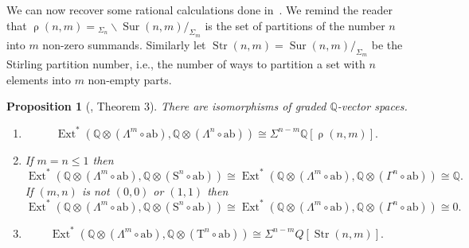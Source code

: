 \documentclass[psamsfonts]{amsart}
\theoremstyle{plain}
\newtheorem{prop}[thm]{Proposition}
\theoremstyle{definition}
\theoremstyle{remark}
\newcommand{\Q}{\mathbb{Q}}
\newcommand{\abelianization}{\mathrm{ab}}
\newcommand{\tensor}{\mathrm{T}}
\newcommand{\symm}{\mathrm{S}}
\DeclareMathOperator{\ext}{Ext}
\DeclareMathOperator{\sur}{Sur}
\DeclareMathOperator{\Part}{\rho}
\DeclareMathOperator{\Stirling}{Str}
\begin{document}
We can now recover some rational calculations done in~\cite{Vespa2018}. We remind the reader that $\Part(n, m)={_{\Sigma_n}\backslash}\sur(n, m)/_{\Sigma_m}$ is the set of partitions of the number $n$ into $m$ non-zero summands. Similarly let $\Stirling(n, m)=\sur(n, m)/_{\Sigma_m}$ be the Stirling partition number, i.e., the number of ways to partition a set with $n$ elements into $m$ non-empty parts.
\begin{prop}[\cite{Vespa2018}, Theorem 3] \label{prop:Vespa theorem 3}
There are isomorphisms of graded $\Q$-vector spaces.
\begin{enumerate}
\item\label{eq:rational lambda to lambda}
\[
\ext^*(\Q\otimes(\Lambda^m\circ \abelianization), \Q\otimes(\Lambda^n \circ \abelianization))\cong \Sigma^{n-m}\Q[\Part(n, m)].
\]
\item \label{eq: rational lambda to gamma}
If $m=n\le 1$ then 
\[
\ext^*(\Q\otimes(\Lambda^m\circ \abelianization), \Q\otimes(\symm^n \circ \abelianization))\cong \ext^*(\Q\otimes(\Lambda^m\circ \abelianization), \Q\otimes(\Gamma^n \circ \abelianization))\cong\Q.
\]
If $(m,n)$ is not $(0,0)$ or $(1,1)$ then 
\[
\ext^*(\Q\otimes(\Lambda^m\circ \abelianization), \Q\otimes(\symm^n \circ \abelianization))\cong \ext^*(\Q\otimes(\Lambda^m\circ \abelianization), \Q\otimes(\Gamma^n \circ \abelianization))\cong 0.
\]
\item \label{eq: rational lambda to tensor}
\[
\ext^*(\Q\otimes(\Lambda^m\circ \abelianization), \Q\otimes(\tensor^n \circ \abelianization))\cong \Sigma^{n-m}Q[\Stirling(n, m)].
\]
\end{enumerate}
\end{prop}
\end{document}
